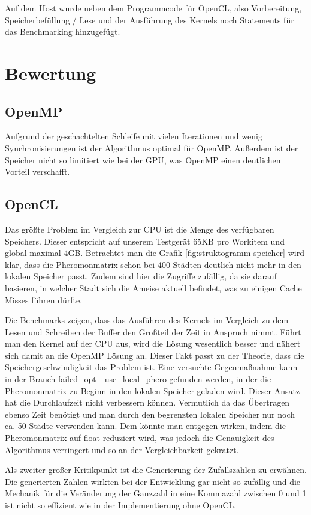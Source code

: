Auf dem Host wurde neben dem Programmcode für OpenCL, also Vorbereitung, Speicherbefüllung / Lese und der Ausführung des Kernels noch Statements für das Benchmarking hinzugefügt.

\section{Bewertung}

\subsection{OpenMP}
Aufgrund der geschachtelten Schleife mit vielen Iterationen und wenig Synchronisierungen ist der Algorithmus optimal für OpenMP.
Außerdem ist der Speicher nicht so limitiert wie bei der GPU, was OpenMP einen deutlichen Vorteil verschafft.

\subsection{OpenCL}
Das größte Problem im Vergleich zur CPU ist die Menge des verfügbaren Speichers.
Dieser entspricht auf unserem Testgerät 65KB pro Workitem und global maximal 4GB.
Betrachtet man die Grafik \ref{fig:struktogramm-speicher} wird klar, dass die Pheromonmatrix schon bei 400 Städten deutlich nicht mehr in den lokalen Speicher passt.
Zudem sind hier die Zugriffe zufällig, da sie darauf basieren, in welcher Stadt sich die Ameise aktuell befindet, was zu einigen Cache Misses führen dürfte.

Die Benchmarks zeigen, dass das Ausführen des Kernels im Vergleich zu dem Lesen und Schreiben der Buffer den Großteil der Zeit in Anspruch nimmt.
Führt man den Kernel auf der CPU aus, wird die Lösung wesentlich besser und nähert sich damit an die OpenMP Lösung an.
Dieser Fakt passt zu der Theorie, dass die Speichergeschwindigkeit das Problem ist.
Eine versuchte Gegenmaßnahme kann in der Branch failed\_opt - use\_local\_phero gefunden werden, in der die Pheromonmatrix zu Beginn in den lokalen Speicher geladen wird.
Dieser Ansatz hat die Durchlaufzeit nicht verbessern können.
Vermutlich da das Übertragen ebenso Zeit benötigt und man durch den begrenzten lokalen Speicher nur noch ca. 50 Städte verwenden kann.
Dem könnte man entgegen wirken, indem die Pheromonmatrix auf float reduziert wird, was jedoch die Genauigkeit des Algorithmus verringert und so an der Vergleichbarkeit gekratzt.

Als zweiter großer Kritikpunkt ist die Generierung der Zufallszahlen zu erwähnen. 
Die generierten Zahlen wirkten bei der Entwicklung gar nicht so zufällig und die Mechanik für die Veränderung der Ganzzahl in eine Kommazahl zwischen 0 und 1 ist nicht so effizient wie in der Implementierung ohne OpenCL.

